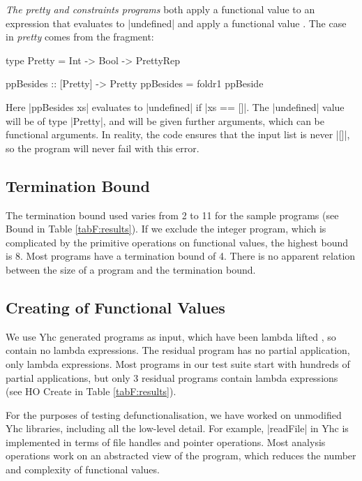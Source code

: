 \begin{example}
\textit{The pretty and constraints programs} both apply a functional value to an expression that evaluates to |undefined| and apply a functional value . The case in \textit{pretty} comes from the fragment:

\begin{comment}
\begin{code}
data PrettyRep = PrettyRep
ppBeside :: Pretty -> Pretty -> Pretty
\end{code}
\end{comment}
\begin{code}
type Pretty = Int -> Bool -> PrettyRep

ppBesides :: [Pretty] -> Pretty
ppBesides = foldr1 ppBeside
\end{code}

Here |ppBesides xs| evaluates to |undefined| if |xs == []|. The |undefined| value will be of type |Pretty|, and will be given further arguments, which can be functional arguments. In reality, the code ensures that the input list is never |[]|, so the program will never fail with this error.
\end{example}

\subsection{Termination Bound}

The termination bound used varies from 2 to 11 for the sample programs (see Bound in Table \ref{tabF:results}). If we exclude the integer program, which is complicated by the primitive operations on functional values, the highest bound is 8. Most programs have a termination bound of 4. There is no apparent relation between the size of a program and the termination bound.

\subsection{Creating of Functional Values}

We use Yhc generated programs as input, which have been lambda lifted \cite{lambda_lift}, so contain no lambda expressions. The residual program has no partial application, only lambda expressions. Most programs in our test suite start with hundreds of partial applications, but only 3 residual programs contain lambda expressions (see HO Create in Table \ref{tabF:results}).

For the purposes of testing defunctionalisation, we have worked on unmodified Yhc libraries, including all the low-level detail. For example, |readFile| in Yhc is implemented in terms of file handles and pointer operations. Most analysis operations work on an abstracted view of the program, which reduces the number and complexity of functional values.

